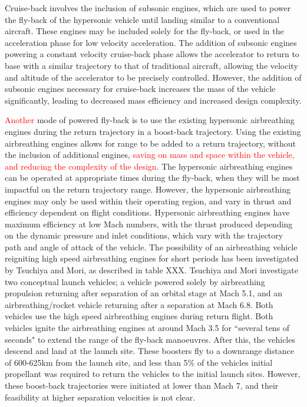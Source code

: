 Cruise-back involves the inclusion of subsonic engines, which are used to power the fly-back of the hypersonic vehicle until landing similar to a conventional aircraft. These engines may be included solely for the fly-back\cite{Hellman}, or used in the acceleration phase for low velocity acceleration\cite{Mehta2001,Tetlow1992,Wilhite1991}. The addition of subsonic engines powering a constant velocity cruise-back phase allows the accelerator to return to base with a similar trajectory to that of traditional aircraft, allowing the velocity and altitude of the accelerator to be precisely controlled. However, the addition of subsonic engines necessary for cruise-back increases the mass of the vehicle significantly, leading to decreased mass efficiency and increased design complexity\cite{Hellman}. 

\textcolor{red}{Another} mode of powered fly-back is to use the existing hypersonic airbreathing engines during the return trajectory in a boost-back trajectory. Using the existing airbreathing engines allows for range to be added to a return trajectory, without the inclusion of additional engines, \textcolor{red}{saving on mass and space within the vehicle, and reducing the complexity of the design}. The hypersonic airbreathing engines can be operated at appropriate times during the fly-back, when they will be most impactful on the return trajectory range. However, the hypersonic airbreathing engines may only be used within their operating region, and vary in thrust and efficiency dependent on flight conditions. Hypersonic airbreathing engines have maximum efficiency at low Mach numbers\cite{Preller2017b}, with the thrust produced depending on the dynamic pressure and inlet conditions, which vary with the trajectory path and angle of attack of the vehicle. 
The possibility of an airbreathing vehicle reigniting high speed airbreathing engines for short periods has been investigated by Tsuchiya and Mori\cite{Tsuchiya2005}, as described in table XXX.  Tsuchiya and Mori investigate two conceptual launch vehicles; a vehicle powered solely by airbreathing propulsion returning after separation of an orbital stage at Mach 5.1, and an airbreathing/rocket vehicle returning after a separation at Mach 6.8\cite{Tsuchiya2005}.  Both vehicles use the high speed airbreathing engines during return flight. Both vehicles ignite the airbreathing engines at around Mach 3.5 for ``several tens of seconds" to extend the range of the fly-back manoeuvres. After this, the vehicles descend and land at the launch site. 
These boosters fly to a downrange distance of 600-625km from the launch site, and less than 5\% of the vehicles initial propellant was required to return the vehicles to the initial launch sites\cite{Tsuchiya2005}. However, these boost-back trajectories were initiated at lower than Mach 7, and their feasibility at higher separation velocities is not clear.
